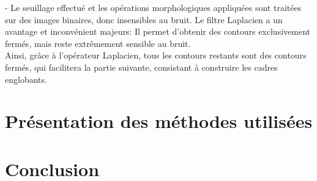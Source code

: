 \documentclass[10pt,a4paper]{report}
\begin{document}
	- Le seuillage effectué et les opérations morphologiques appliquées sont traitées sur des images binaires, donc insensibles au bruit. Le filtre Laplacien a un avantage et inconvénient majeurs: Il permet d'obtenir des contours exclusivement fermés, mais reste extrêmement sensible au bruit.\\
	\newline
Ainsi, grâce à l'opérateur Laplacien, tous les contours restants sont des contours fermés, qui facilitera la partie suivante, consistant à construire les cadres englobants.


\section{Présentation des méthodes utilisées}

\section{Conclusion}
\end{document}
